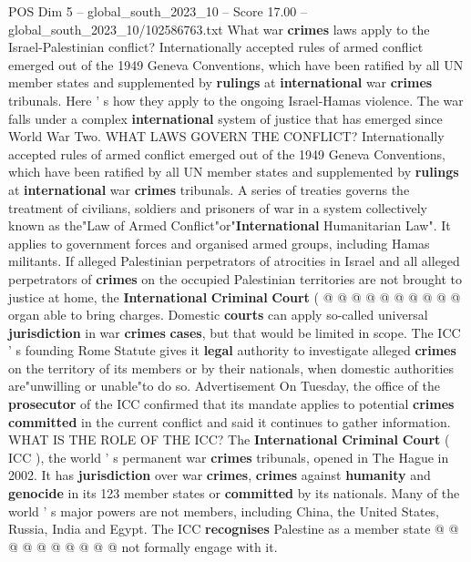 \begin{textsample}{POS Dim 5 – global\_south\_2023\_10 – Score 17.00 – global\_south\_2023\_10/102586763.txt}  \label{ex:f5_pos_381}
What war \textbf{crimes} laws apply to the Israel-Palestinian conflict?
Internationally accepted rules of armed conflict emerged out of the 1949 Geneva Conventions, which have been ratified by all UN member states and supplemented by \textbf{rulings} at \textbf{international} war \textbf{crimes} tribunals.
Here ' s how they apply to the ongoing Israel-Hamas violence.
The war falls under a complex \textbf{international} system of justice that has emerged since World War Two.
WHAT LAWS GOVERN THE CONFLICT?
Internationally accepted rules of armed conflict emerged out of the 1949 Geneva Conventions, which have been ratified by all UN member states and supplemented by \textbf{rulings} at \textbf{international} war \textbf{crimes} tribunals.
A series of treaties governs the treatment of civilians, soldiers and prisoners of war in a system collectively known as the"Law of Armed Conflict"or"\textbf{International} Humanitarian Law".
It applies to government forces and organised armed groups, including Hamas militants.
If alleged Palestinian perpetrators of atrocities in Israel and all alleged perpetrators of \textbf{crimes} on the occupied Palestinian territories are not brought to justice at home, the \textbf{International} \textbf{Criminal} \textbf{Court} ( @ @ @ @ @ @ @ @ @ @ organ able to bring charges.
Domestic \textbf{courts} can apply so-called universal \textbf{jurisdiction} in war \textbf{crimes} \textbf{cases}, but that would be limited in scope.
The ICC ' s founding Rome Statute gives it \textbf{legal} authority to investigate alleged \textbf{crimes} on the territory of its members or by their nationals, when domestic authorities are"unwilling or unable"to do so.
Advertisement On Tuesday, the office of the \textbf{prosecutor} of the ICC confirmed that its mandate applies to potential \textbf{crimes} \textbf{committed} in the current conflict and said it continues to gather information.
WHAT IS THE ROLE OF THE ICC?
The \textbf{International} \textbf{Criminal} \textbf{Court} ( ICC ), the world ' s permanent war \textbf{crimes} tribunals, opened in The Hague in 2002.
It has \textbf{jurisdiction} over war \textbf{crimes}, \textbf{crimes} against \textbf{humanity} and \textbf{genocide} in its 123 member states or \textbf{committed} by its nationals.
Many of the world ' s major powers are not members, including China, the United States, Russia, India and Egypt.
The ICC \textbf{recognises} Palestine as a member state @ @ @ @ @ @ @ @ @ @ not formally engage with it.

\end{textsample}
